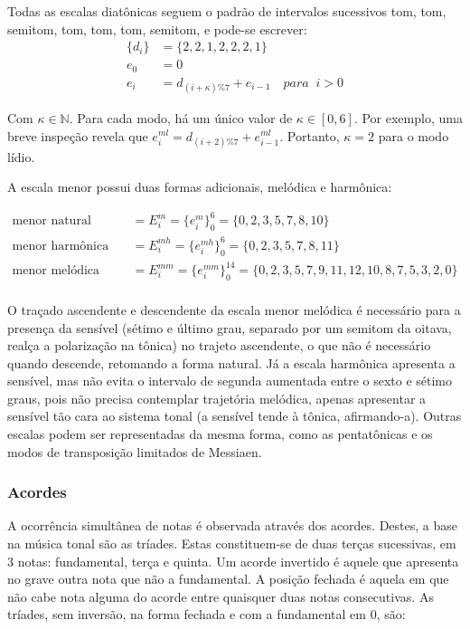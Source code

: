 Todas as escalas diatônicas
seguem o padrão de intervalos sucessivos
tom, tom, semitom, tom, tom, tom, semitom, e
pode-se escrever:
\begin{equation}\label{eq:relacaoDia}
\begin{split}
\{d_i\} & =\{2,2,1,2,2,2,1\} \\
e_0 & =0 \\
e_i & =d_{(i+\kappa)\%7}+e_{i-1} \quad para \;\;  i > 0
\end{split}
\end{equation}

Com $\kappa \in \mathbb{N}$. Para cada
modo, há um único valor de $\kappa \in [0,6]$.
Por exemplo, uma breve
inspeção revela que $e_i^{ml}=d_{(i+2)\%7}+e_{i-1}^{ml}$. Portanto, $\kappa=2$
para o modo lídio. 

A escala menor possui duas formas adicionais, melódica e harmônica:

\begin{equation}\label{eq:escalasMenores}
\begin{split}
\text{menor natural (igual acima)} & = E_i^m = \{e_i^m\}_0^6 = \{0,2,3,5,7,8,10\} \\
\text{menor harmônica} & = E_i^{mh} = \{e_i^{mh}\}_0^6 = \{0,2,3,5,7,8,11\} \\
\text{menor melódica} & = E_i^{mm} = \{e_i^{mm}\}_0^{14} = \{0,2,3,5,7,9,11,12,10,8,7,5,3,2,0\} \\
\end{split}
\end{equation}

O traçado ascendente e descendente da escala menor melódica é necessário para a presença da sensível (sétimo e último grau, separado por um semitom da oitava, realça a polarização na tônica) no trajeto ascendente, o que não é necessário quando descende, retomando a forma natural. Já a escala harmônica apresenta a sensível, mas não evita o intervalo de segunda aumentada entre o sexto e sétimo graus, pois não precisa contemplar trajetória melódica, apenas apresentar a sensível tão cara ao sistema tonal (a sensível tende à tônica, afirmando-a).\cite{Harmonia}
Outras escalas podem ser representadas da mesma forma, como as pentatônicas e os modos de transposição limitados de Messiaen.\cite{Messiaen}

\subsubsection{Acordes}\label{subsec:acordes}
A ocorrência simultânea de notas é observada através dos acordes. Destes, a base na música tonal são as tríades. Estas constituem-se de duas terças sucessivas, em 3 notas: fundamental, terça e quinta. Um acorde invertido é aquele que apresenta no grave outra nota que não a fundamental. A posição fechada é aquela em que não cabe nota alguma do acorde entre quaisquer duas notas consecutivas.\cite{Lacerda}
As tríades, sem inversão, na forma fechada e com a fundamental em $0$, são:

